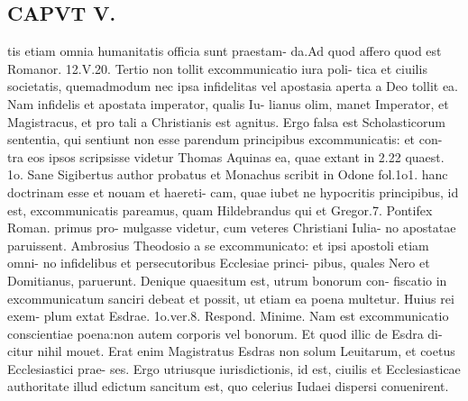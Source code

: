 \documentclass{article}
\begin{document}
\begin{pages}
\section*{CAPVT  V. }
\marginpar{[ p.40 ]}tis etiam omnia humanitatis officia sunt praestam- da.Ad quod affero quod est Romanor. 12.V.20. Tertio non tollit excommunicatio iura poli- tica et ciuilis societatis, quemadmodum nec ipsa infidelitas vel apostasia aperta a Deo tollit ea. Nam infidelis et apostata imperator, qualis Iu- lianus olim, manet Imperator, et Magistracus, et pro tali a Christianis est agnitus. Ergo falsa est Scholasticorum sententia, qui sentiunt non esse parendum principibus excommunicatis: et con- tra eos ipsos scripsisse videtur Thomas Aquinas ea, quae extant in 2.22 quaest. 1o. Sane Sigibertus author probatus et Monachus scribit in Odone fol.1o1. hanc doctrinam esse et nouam et haereti- cam, quae iubet ne hypocritis principibus, id est, excommunicatis pareamus, quam Hildebrandus qui et Gregor.7. Pontifex Roman. primus pro- mulgasse videtur, cum veteres Christiani Iulia- no apostatae paruissent. Ambrosius Theodosio a se excommunicato: et ipsi apostoli etiam omni- no infidelibus et persecutoribus Ecclesiae princi- pibus, quales Nero et Domitianus, paruerunt. Denique quaesitum est, utrum bonorum con- fiscatio in excommunicatum sanciri debeat et possit, ut etiam ea poena multetur. Huius rei exem- plum extat Esdrae. 1o.ver.8. Respond. Minime. Nam est excommunicatio conscientiae poena:non autem corporis vel bonorum. Et quod illic de Esdra di- citur nihil mouet. Erat enim Magistratus Esdras non solum Leuitarum, et coetus Ecclesiastici prae- ses. Ergo utriusque iurisdictionis, id est, ciuilis et Ecclesiasticae authoritate illud edictum sancitum est, quo celerius Iudaei dispersi conuenirent. 

\end{pages}
\end{document}
